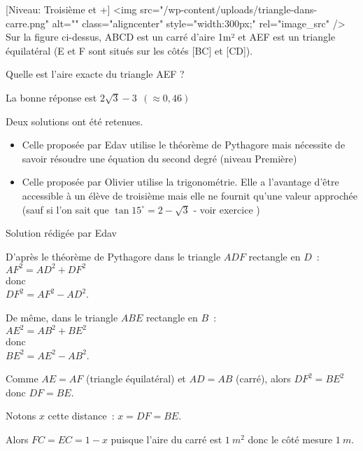
%
[Niveau: Troisième et +]
<img src="/wp-content/uploads/triangle-dans-carre.png" alt="" class="aligncenter" style="width:300px;" rel="image_src" />
Sur la figure ci-dessus, ABCD est un carré d'aire 1m² et AEF est un triangle équilatéral (E et F sont situés sur les côtés [BC] et [CD]).
\par
Quelle est l'aire exacte du triangle AEF ?
\begin{solution}
     \begin{note}
          La bonne réponse est $2 \sqrt{3}-3 \ \ ( \approx 0,46) $
          \par
          Deux solutions ont été retenues.
          \begin{itemize}
               \item
               Celle proposée par Edav utilise le théorème de Pythagore mais nécessite de savoir résoudre une équation du second degré (niveau Première)
               \item
               Celle proposée par Olivier utilise la trigonométrie. Elle a l'avantage d'être accessible à un élève de troisième mais elle ne fournit qu'une valeur approchée (sauf si l'on sait que $\tan 15^{\circ}=  2-\sqrt{3}$ - voir exercice )
          \end{itemize}
     \end{note}
     Solution rédigée par Edav
\begin{note}
  D'après le théorème de Pythagore dans le triangle $ ADF $ rectangle en $ D $~:
\\
$ AF^2 = AD^2 + DF^2 $
\\
donc
\\
$ DF^2 = AF^2 - AD^2 $.
\par
De même, dans le triangle $ ABE $ rectangle en $ B $~:
\\
$ AE^2 = AB^2 + BE^2 $
\\
donc
\\
$ BE^2 = AE^2 - AB^2 $.
\par
Comme $ AE = AF $ (triangle équilatéral) et $ AD = AB $ (carré), alors $ DF^2 = BE^2 $ donc $  DF = BE $.
\par
Notons $ x $ cette distance~: $ x = DF = BE $.
\par
Alors $ FC = EC = 1 - x $ puisque l'aire du carré est $ 1\ m^2 $ donc le côté mesure $ 1\ m. $
\par

\end{note}
\end{solution}

